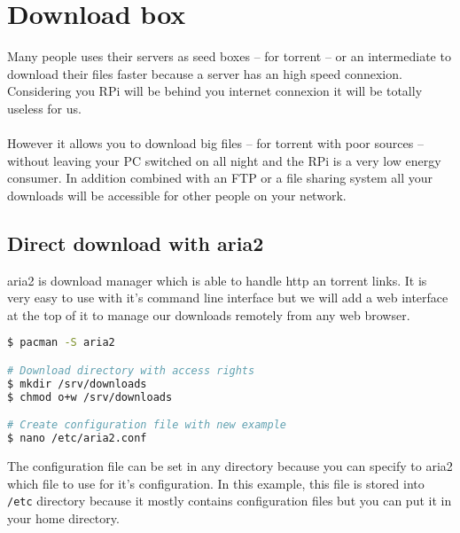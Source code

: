 \chapter{Download box}
Many people uses their servers as seed boxes -- for torrent -- or an intermediate 
to download their files faster because a server has an high speed connexion. 
Considering you RPi will be behind you internet connexion it will be totally useless 
for us.
\\\\
However it allows you to download big files -- for torrent with poor sources -- 
without leaving your PC switched on all night and the RPi is a very low energy 
consumer. In addition combined with an FTP or a file sharing system all your 
downloads will be accessible for other people on your network.

\section{Direct download with aria2}
aria2 is download manager which is able to handle http an torrent links. It is 
very easy to use with it's command line interface but we will add a web interface 
at the top of it to manage our downloads remotely from any web browser.

\begin{lstlisting}[language=bash,caption=Aria2 setup]
$ pacman -S aria2

# Download directory with access rights
$ mkdir /srv/downloads 
$ chmod o+w /srv/downloads

# Create configuration file with new example
$ nano /etc/aria2.conf
\end{lstlisting}

The configuration file can be set in any directory because you can specify to 
aria2 which file to use for it's configuration. In this example, this file is 
stored into \texttt{/etc} directory because it mostly contains configuration 
files but you can put it in your home directory.

